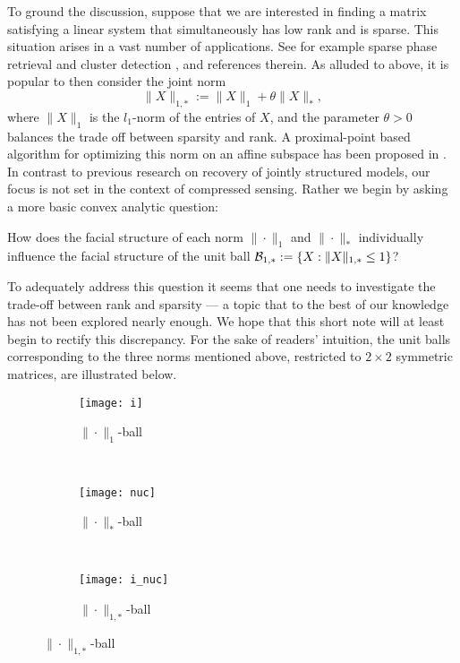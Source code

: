 \documentclass[smallextended,numbook]{svjour3}
\begin{document}
To ground the discussion, suppose that we are interested in finding a matrix satisfying a linear system that simultaneously has low rank and is sparse. This situation arises in a vast number of applications. See for example sparse phase retrieval \cite{PRO,Phase} and cluster detection \cite{sim_sparse, AV}, and references therein. As alluded to above, it is popular to then consider the joint norm  
$$\|X\|_{1,*}:=\|X\|_1 +\theta\|X\|_{*},$$
where $\|X\|_1$ is the $l_1$-norm of the entries of $X$, and
the parameter $\theta >0$ balances the trade off between sparsity and rank. A proximal-point based algorithm for optimizing this norm on an affine subspace has been proposed in \cite{prox_norm}. In contrast to previous research on recovery of jointly structured models, our focus is not set in the context of compressed sensing. Rather we begin by asking a more basic convex analytic question: 
\begin{center}
How does the facial structure of each norm $\|\cdot\|_1$ and $\|\cdot\|_*$ individually influence the facial structure of the unit ball ${{\cal B}}_{1,*}:=\{X:\|X\|_{1,*}\leq 1\}$? 
\end{center}
To adequately address this question it seems that one needs to investigate the trade-off between rank and sparsity --- a topic that to the best of our knowledge has not been explored nearly enough. We hope that this short note will at least begin to rectify this discrepancy. For the sake of readers' intuition, the unit balls corresponding to the three norms mentioned above, restricted to $2\times 2$ symmetric matrices, are illustrated below. 
\begin{figure}[h]
        \centering
        \begin{subfigure}[b]{0.3\textwidth}
                \centering
                \texttt{[image: i]}
                \caption{$\|\cdot\|_{1}$-ball}
        \end{subfigure}        ~ 
          
        \begin{subfigure}[b]{0.3\textwidth}
                \centering
                \texttt{[image: nuc]}
                \caption{$\|\cdot\|_{*}$-ball}
        \end{subfigure}
        ~ 
          
        \begin{subfigure}[b]{0.3\textwidth}
                \centering
                \texttt{[image: i\_nuc]}
                \caption{$\|\cdot\|_{1,*}$-ball}
        \end{subfigure}
\end{figure}
\end{document}
